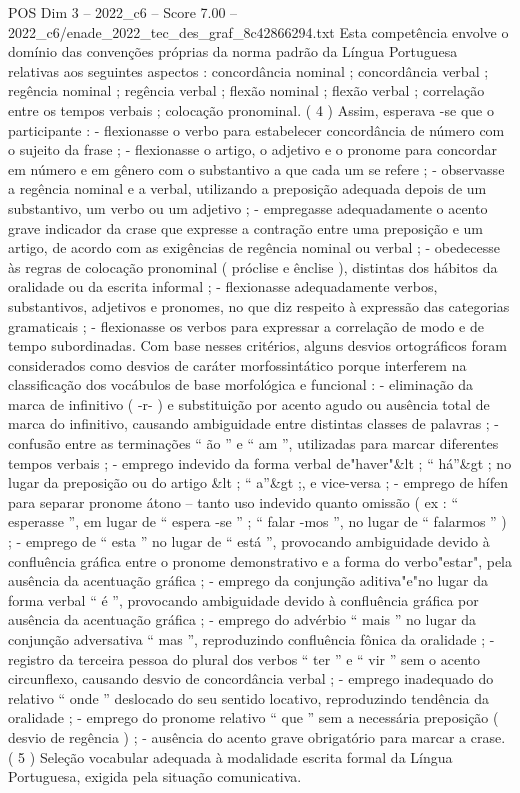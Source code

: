 \begin{textsample}{POS Dim 3 – 2022\_c6 – Score 7.00 – 2022\_c6/enade\_2022\_tec\_des\_graf\_8c42866294.txt}
Esta competência envolve o domínio das convenções próprias da norma padrão da Língua Portuguesa relativas aos seguintes aspectos : concordância nominal ; concordância verbal ; regência nominal ; regência verbal ; flexão nominal ; flexão verbal ; correlação entre os tempos verbais ; colocação pronominal. ( 4 ) Assim, esperava -se que o participante : - flexionasse o verbo para estabelecer concordância de número com o sujeito da frase ; - flexionasse o artigo, o adjetivo e o pronome para concordar em número e em gênero com o substantivo a que cada um se refere ; - observasse a regência nominal e a verbal, utilizando a preposição adequada depois de um substantivo, um verbo ou um adjetivo ; - empregasse adequadamente o acento grave indicador da crase que expresse a contração entre uma preposição e um artigo, de acordo com as exigências de regência nominal ou verbal ; - obedecesse às regras de colocação pronominal ( próclise e ênclise ), distintas dos hábitos da oralidade ou da escrita informal ; - flexionasse adequadamente verbos, substantivos, adjetivos e pronomes, no que diz respeito à expressão das categorias gramaticais ; - flexionasse os verbos para expressar a correlação de modo e de tempo subordinadas.
Com base nesses critérios, alguns desvios ortográficos foram considerados como desvios de caráter morfossintático porque interferem na classificação dos vocábulos de base morfológica e funcional : - eliminação da marca de infinitivo ( -r- ) e substituição por acento agudo ou ausência total de marca do infinitivo, causando ambiguidade entre distintas classes de palavras ; - confusão entre as terminações “ ão ” e “ am ”, utilizadas para marcar diferentes tempos verbais ; - emprego indevido da forma verbal de"haver"\&lt ; “ há”\&gt ; no lugar da preposição ou do artigo \&lt ; “ a”\&gt ;, e vice-versa ; - emprego de hífen para separar pronome átono – tanto uso indevido quanto omissão ( ex : “ esperasse ”, em lugar de “ espera -se ” ; “ falar -mos ”, no lugar de “ falarmos ” ) ; - emprego de “ esta ” no lugar de “ está ”, provocando ambiguidade devido à confluência gráfica entre o pronome demonstrativo e a forma do verbo"estar", pela ausência da acentuação gráfica ; - emprego da conjunção aditiva"e"no lugar da forma verbal “ é ”, provocando ambiguidade devido à confluência gráfica por ausência da acentuação gráfica ; - emprego do advérbio “ mais ” no lugar da conjunção adversativa “ mas ”, reproduzindo confluência fônica da oralidade ; - registro da terceira pessoa do plural dos verbos “ ter ” e “ vir ” sem o acento circunflexo, causando desvio de concordância verbal ; - emprego inadequado do relativo “ onde ” deslocado do seu sentido locativo, reproduzindo tendência da oralidade ; - emprego do pronome relativo “ que ” sem a necessária preposição ( desvio de regência ) ; - ausência do acento grave obrigatório para marcar a crase. ( 5 ) Seleção vocabular adequada à modalidade escrita formal da Língua Portuguesa, exigida pela situação comunicativa.

\end{textsample}
